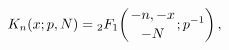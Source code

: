 \[\mathop{K_{n}\/}\nolimits\!\left(x;p,N\right)=\mathop{{{}_{2}F_{1}}\/}%
\nolimits\!\left({-n,-x\atop-N};p^{-1}\right),\]